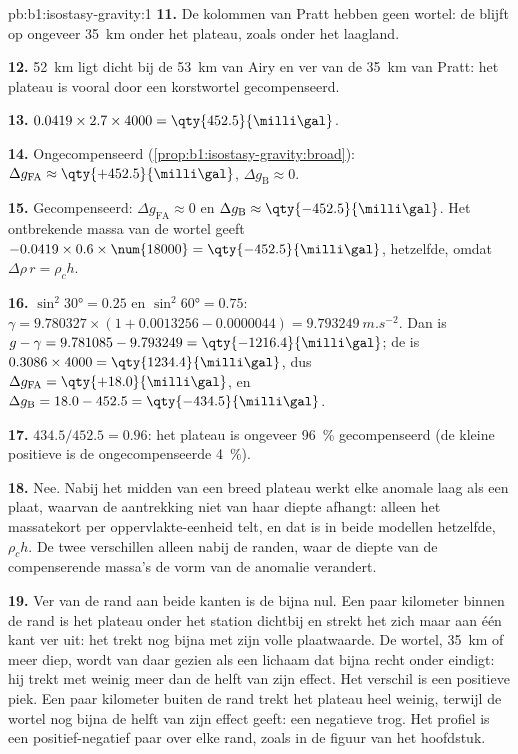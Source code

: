 \begin{solution}{pb:b1:isostasy-gravity:1}
\textbf{11.} De kolommen van Pratt hebben geen wortel: de  blijft op ongeveer \qty{35}{km} onder het plateau, zoals onder het laagland.

\textbf{12.} \qty{52}{km} ligt dicht bij de \qty{53}{km} van Airy en ver van de \qty{35}{km} van Pratt: het plateau is vooral door een korstwortel gecompenseerd.

\textbf{13.} $0.0419\times2.7\times4000 = \qty{452.5}{\milli\gal}$.

\textbf{14.} Ongecompenseerd (\cref{prop:b1:isostasy-gravity:broad}):
$\Delta g_{\mathrm{FA}} \approx \qty{+452.5}{\milli\gal}$,
$\Delta g_{\mathrm B} \approx 0$.

\textbf{15.} Gecompenseerd: $\Delta g_{\mathrm{FA}} \approx 0$ en
$\Delta g_{\mathrm B} \approx \qty{-452.5}{\milli\gal}$. Het ontbrekende massa van de wortel geeft $-0.0419\times0.6\times\num{18000} = \qty{-452.5}{\milli\gal}$, hetzelfde, omdat $\Delta\rho\,r = \rho_c h$.

\textbf{16.} $\sin^2\ang{30} = 0.25$ en $\sin^2\ang{60} = 0.75$:
$\gamma = 9.780327\times(1 + 0.0013256 - 0.0000044) = \qty{9.793249}{m.s^{-2}}$.
Dan is $g - \gamma = 9.781085 - 9.793249 = \qty{-1216.4}{\milli\gal}$; de  is $0.3086\times4000 = \qty{1234.4}{\milli\gal}$, dus $\Delta g_{\mathrm{FA}} = \qty{+18.0}{\milli\gal}$, en $\Delta g_{\mathrm B} = 18.0 - 452.5 = \qty{-434.5}{\milli\gal}$.

\textbf{17.} $434.5/452.5 = 0.96$: het plateau is ongeveer \qty{96}{\percent} gecompenseerd (de kleine positieve  is de ongecompenseerde \qty{4}{\percent}).

\textbf{18.} Nee. Nabij het midden van een breed plateau werkt elke anomale laag als een plaat, waarvan de aantrekking niet van haar diepte afhangt: alleen het massatekort per oppervlakte-eenheid telt, en dat is in beide modellen hetzelfde, $\rho_c h$. De twee verschillen alleen nabij de randen, waar de diepte van de compenserende massa's de vorm van de anomalie verandert.

\textbf{19.} Ver van de rand aan beide kanten is de  bijna nul. Een paar kilometer binnen de rand is het plateau onder het station dichtbij en strekt het zich maar aan één kant ver uit: het trekt nog bijna met zijn volle plaatwaarde. De wortel, \qty{35}{km} of meer diep, wordt van daar gezien als een lichaam dat bijna recht onder eindigt: hij trekt met weinig meer dan de helft van zijn effect. Het verschil is een positieve piek. Een paar kilometer buiten de rand trekt het plateau heel weinig, terwijl de wortel nog bijna de helft van zijn effect geeft: een negatieve trog. Het profiel is een positief-negatief paar over elke rand, zoals in de figuur van het hoofdstuk.


\end{solution}
